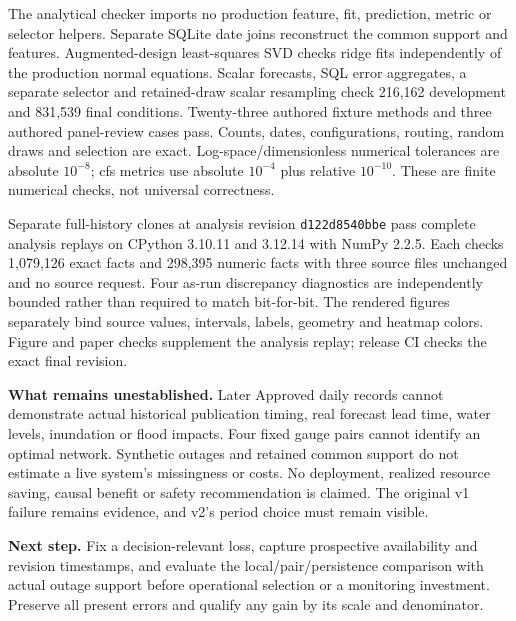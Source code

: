 \documentclass[11pt]{article}
\newcommand{\DevChecks}{216,162}
\newcommand{\FinalChecks}{831,539}
\newcommand{\ReplayExact}{1,079,126}
\newcommand{\ReplayNumeric}{298,395}
\begin{document}
The analytical checker imports no production feature, fit, prediction, metric or selector helpers. Separate SQLite date joins reconstruct the common support and features. Augmented-design least-squares SVD checks ridge fits independently of the production normal equations. Scalar forecasts, SQL error aggregates, a separate selector and retained-draw scalar resampling check \DevChecks{} development and \FinalChecks{} final conditions. Twenty-three authored fixture methods and three authored panel-review cases pass. Counts, dates, configurations, routing, random draws and selection are exact. Log-space/dimensionless numerical tolerances are absolute $10^{-8}$; cfs metrics use absolute $10^{-4}$ plus relative $10^{-10}$. These are finite numerical checks, not universal correctness.

Separate full-history clones at analysis revision \texttt{d122d8540bbe} pass complete analysis replays on CPython 3.10.11 and 3.12.14 with NumPy 2.2.5. Each checks \ReplayExact{} exact facts and \ReplayNumeric{} numeric facts with three source files unchanged and no source request. Four as-run discrepancy diagnostics are independently bounded rather than required to match bit-for-bit. The rendered figures separately bind source values, intervals, labels, geometry and heatmap colors. Figure and paper checks supplement the analysis replay; release CI checks the exact final revision.

\textbf{What remains unestablished.} Later Approved daily records cannot demonstrate actual historical publication timing, real forecast lead time, water levels, inundation or flood impacts. Four fixed gauge pairs cannot identify an optimal network. Synthetic outages and retained common support do not estimate a live system's missingness or costs. No deployment, realized resource saving, causal benefit or safety recommendation is claimed. The original v1 failure remains evidence, and v2's period choice must remain visible.

\textbf{Next step.} Fix a decision-relevant loss, capture prospective availability and revision timestamps, and evaluate the local/pair/persistence comparison with actual outage support before operational selection or a monitoring investment. Preserve all present errors and qualify any gain by its scale and denominator.
\end{document}
